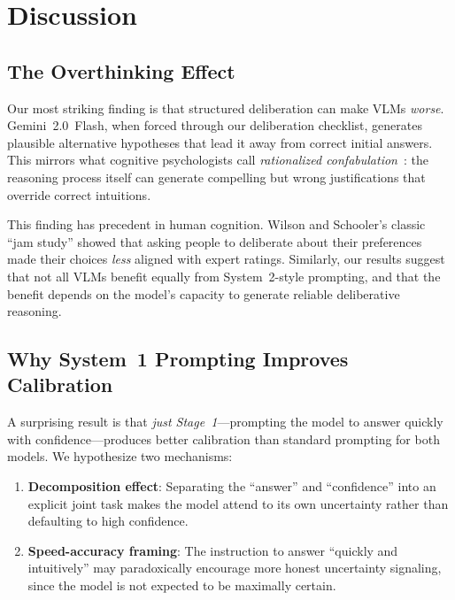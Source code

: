 \documentclass{cvpr}
\begin{document}
\section{Discussion}

\subsection{The Overthinking Effect}

Our most striking finding is that structured deliberation can make VLMs \emph{worse}. Gemini~2.0~Flash, when forced through our deliberation checklist, generates plausible alternative hypotheses that lead it away from correct initial answers. This mirrors what cognitive psychologists call \emph{rationalized confabulation}~\cite{stanovich2000individual}: the reasoning process itself can generate compelling but wrong justifications that override correct intuitions.

This finding has precedent in human cognition. Wilson and Schooler's classic ``jam study'' showed that asking people to deliberate about their preferences made their choices \emph{less} aligned with expert ratings. Similarly, our results suggest that not all VLMs benefit equally from System~2-style prompting, and that the benefit depends on the model's capacity to generate reliable deliberative reasoning.

\subsection{Why System~1 Prompting Improves Calibration}

A surprising result is that \emph{just Stage~1}---prompting the model to answer quickly with confidence---produces better calibration than standard prompting for both models. We hypothesize two mechanisms:
\begin{enumerate}
    \item \textbf{Decomposition effect}: Separating the ``answer'' and ``confidence'' into an explicit joint task makes the model attend to its own uncertainty rather than defaulting to high confidence.
    \item \textbf{Speed-accuracy framing}: The instruction to answer ``quickly and intuitively'' may paradoxically encourage more honest uncertainty signaling, since the model is not expected to be maximally certain.
\end{enumerate}
\end{document}
